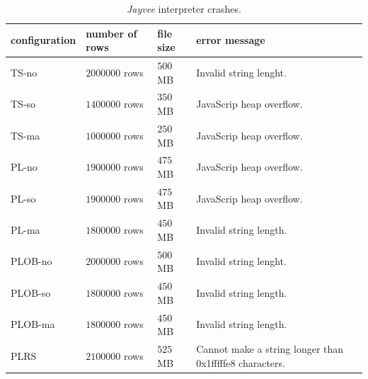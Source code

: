 \begin{table}[H]
	\caption{\emph{Jayvee} interpreter crashes.}
	\label{tab:crashes}
	\begin{center}
		\begin{tabularx}{\textwidth}{|l|l|l|X|}
			\hline
			configuration & number of rows   & file size     & error message                                           \\
			\hline
			\hline
			TS-no         & $2 000 000$ rows & $500$ \ac{MB} & Invalid string lenght.                                  \\
			TS-so         & $1 400 000$ rows & $350$ \ac{MB} & JavaScrip heap overflow.                                \\
			TS-ma         & $1 000 000$ rows & $250$ \ac{MB} & JavaScrip heap overflow.                                \\
			\hline
			PL-no         & $1 900 000$ rows & $475$ \ac{MB} & JavaScrip heap overflow.                                \\
			PL-so         & $1 900 000$ rows & $475$ \ac{MB} & JavaScrip heap overflow.                                \\
			PL-ma         & $1 800 000$ rows & $450$ \ac{MB} & Invalid string length.                                  \\
			\hline
			PLOB-no       & $2 000 000$ rows & $500$ \ac{MB} & Invalid string lenght.                                  \\
			PLOB-so       & $1 800 000$ rows & $450$ \ac{MB} & Invalid string length.                                  \\
			PLOB-ma       & $1 800 000$ rows & $450$ \ac{MB} & Invalid string length.                                  \\
			\hline
			PLRS          & $2 100 000$ rows & $525$ \ac{MB} & Cannot make a string longer than 0x1fffffe8 characters. \\
			\hline
		\end{tabularx}
	\end{center}
\end{table}

